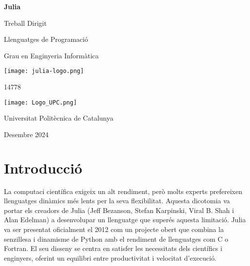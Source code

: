 \documentclass[a4paper]{article}
\begin{document}
\begin{titlepage}
    \centering
    {\huge \textbf{Julia}\par}
    \vspace{1cm}
    {\LARGE Treball Dirigit\par}
    {\LARGE Llenguatges de Programació\par}
    \vspace{0.5cm}
    {\Large Grau en Enginyeria Informàtica\par}
    \vspace{1cm}

    \texttt{[image: julia-logo.png]}
    \vspace{1cm}

    {\LARGE 14778\par}
    \vspace{1cm}

    \texttt{[image: Logo\_UPC.png]}\par
    \vspace{0.5cm}
    {\Large Universitat Politècnica de Catalunya\par}
    \vspace{0.5cm}
    {\Large Desembre 2024\par}

    \vfill
\end{titlepage}

\newpage
\tableofcontents
\newpage

\section{Introducció}
La computaci científica exigeix un alt rendiment, però molts experts prefereixen
llenguatges dinàmics més lents per la seva flexibilitat. Aquesta dicotomia va portar
els creadors de Julia (Jeff Bezanson, Stefan Karpinski, Viral B. Shah i Alan Edelman)
a desenvolupar un llenguatge que superés aquesta limitació. Julia va ser presentat
oficialment el 2012 com un projecte obert que combina la senzillesa i dinamisme de Python
amb el rendiment de llenguatges com C o Fortran. El seu disseny se centra en satisfer les
necessitats dels científics i enginyers, oferint un equilibri entre productivitat i velocitat d'execució.
\end{document}
